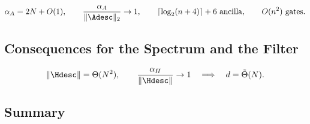 \begin{proposition}
\label{prop:descriptor-cost}
\begin{equation}
    \alpha_A = 2N + O(1),
    \qquad
    \frac{\alpha_A}{\|\Adesc\|_2} \to 1,
    \qquad
    \lceil \log_2(n+4) \rceil + 6\ \text{ancilla},
    \qquad
    O(n^2)\ \text{gates} .
    \label{eq:descriptor-cost}
\end{equation}
\end{proposition}

\subsection{Consequences for the Spectrum and the Filter}
\label{sec:descriptor-spectrum}

\begin{equation}
    \|\Hdesc\| = \Theta(N^2),
    \qquad
    \frac{\alpha_H}{\|\Hdesc\|} \to 1
    \quad\Longrightarrow\quad
    d = \tilde\Theta(N) .
    \label{eq:descriptor-degree}
\end{equation}

\subsection{Summary}
\label{sec:descriptor-summary}

